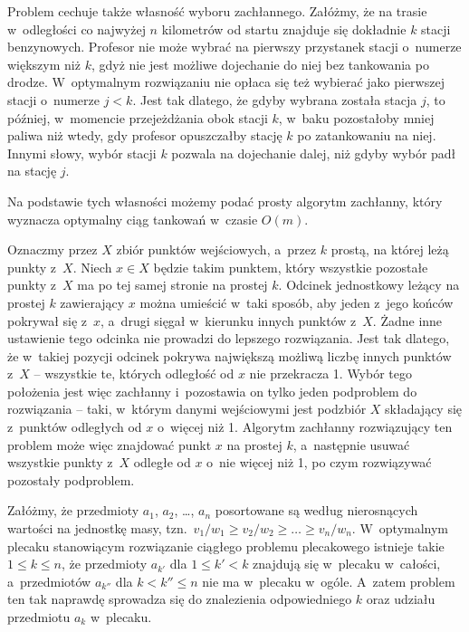Problem cechuje także własność wyboru zachłannego.
Załóżmy, że na trasie w~odległości co najwyżej $n$ kilometrów od startu znajduje się dokładnie $k$ stacji benzynowych.
Profesor nie może wybrać na pierwszy przystanek stacji o~numerze większym niż $k$, gdyż nie jest możliwe dojechanie do niej bez tankowania po drodze.
W~optymalnym rozwiązaniu nie opłaca się też wybierać jako pierwszej stacji o~numerze $j<k$.
Jest tak dlatego, że gdyby wybrana została stacja $j$, to później, w~momencie przejeżdżania obok stacji $k$, w~baku pozostałoby mniej paliwa niż wtedy, gdy profesor opuszczałby stację $k$ po zatankowaniu na niej.
Innymi słowy, wybór stacji $k$ pozwala na dojechanie dalej, niż gdyby wybór padł na stację $j$.

Na podstawie tych własności możemy podać prosty algorytm zachłanny, który wyznacza optymalny ciąg tankowań w~czasie $O(m)$.

\exercise %
Oznaczmy przez $X$ zbiór punktów wejściowych, a~przez $k$ prostą, na której leżą punkty z~$X$.
Niech $x\in X$ będzie takim punktem, który wszystkie pozostałe punkty z~$X$ ma po tej samej stronie na prostej $k$.
Odcinek jednostkowy leżący na prostej $k$ zawierający $x$ można umieścić w~taki sposób, aby jeden z~jego końców pokrywał się z~$x$, a~drugi sięgał w~kierunku innych punktów z~$X$.
Żadne inne ustawienie tego odcinka nie prowadzi do lepszego rozwiązania.
Jest tak dlatego, że w~takiej pozycji odcinek pokrywa największą możliwą liczbę innych punktów z~$X$ -- wszystkie te, których odległość od $x$ nie przekracza 1.
Wybór tego położenia jest więc zachłanny i~pozostawia on tylko jeden podproblem do rozwiązania -- taki, w~którym danymi wejściowymi jest podzbiór $X$ składający się z~punktów odległych od $x$ o~więcej niż 1.
Algorytm zachłanny rozwiązujący ten problem może więc znajdować punkt $x$ na prostej $k$, a~następnie usuwać wszystkie punkty z~$X$ odległe od $x$ o~nie więcej niż 1, po czym rozwiązywać pozostały podproblem.

\exercise %
Załóżmy, że przedmioty $a_1$, $a_2$, \dots, $a_n$ posortowane są według nierosnących wartości na jednostkę masy, tzn.\ $v_1/w_1\ge v_2/w_2\ge\dots\ge v_n/w_n$.
W~optymalnym plecaku stanowiącym rozwiązanie ciągłego problemu plecakowego istnieje takie $1\le k\le n$, że przedmioty $a_{k'}$ dla $1\le k'<k$ znajdują się w~plecaku w~całości, a~przedmiotów $a_{k''}$ dla $k<k''\le n$ nie ma w~plecaku w~ogóle.
A~zatem problem ten tak naprawdę sprowadza się do znalezienia odpowiedniego $k$ oraz udziału przedmiotu $a_k$ w~plecaku.

